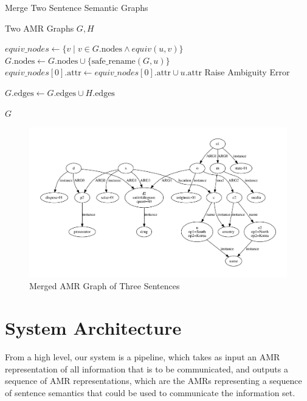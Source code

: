 \documentclass[12pt]{article}
\begin{document}
\begin{algorithm}
\caption{Merge Two Sentence Semantic Graphs}
\label{alg:merge_graphs}
\begin{algorithmic}[1]
\REQUIRE Two AMR Graphs $G, H$

    \STATE $equiv\_nodes \gets \{v \mid v \in G.\text{nodes} \land equiv(u,v)\}$
        \STATE $G.\text{nodes} \gets G.\text{nodes} \cup \{\text{safe\_rename}(G, u)\}$
        \STATE $equiv\_nodes[0].\text{attr} \gets equiv\_nodes[0].\text{attr} \cup u.\text{attr}$
    \ELSE
        \STATE Raise Ambiguity Error
    \ENDIF
\ENDFOR

\STATE $G.\text{edges} \gets G.\text{edges} \cup H.\text{edges}$

\RETURN $G$
\end{algorithmic}
\end{algorithm}

\begin{figure}
\includegraphics[width=\linewidth]{amr_example_3_merged.pdf}
\caption{Merged AMR Graph of Three Sentences}
\label{fig:amr_example_3_merged}
\end{figure}

\section{System Architecture}

From a high level, our system is a pipeline, which takes as input an AMR representation
of all information that is to be communicated, and outputs a
sequence of AMR representations, which are the AMRs representing a sequence of sentence semantics that could be used to communicate the 
information set.
\end{document}
